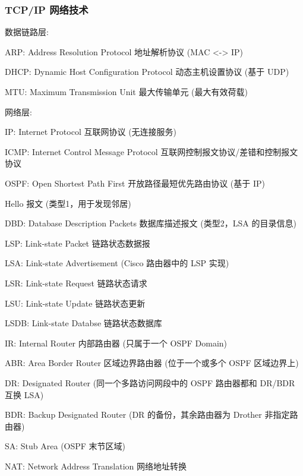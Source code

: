 \documentclass[UTF8,cs4size]{ctexart}
\begin{document}
\subsubsection{TCP/IP 网络技术}
数据链路层:
\begin{compactitem}
  \item ARP: Address Resolution Protocol 地址解析协议 (MAC <-> IP)
  \item DHCP: Dynamic Host Configuration Protocol 动态主机设置协议 (基于 UDP)
  \item MTU: Maximum Transmission Unit 最大传输单元 (最大有效荷载)
\end{compactitem}

网络层:
\begin{compactitem}
  \item IP: Internet Protocol 互联网协议 (无连接服务)
  \item ICMP: Internet Control Message Protocol 互联网控制报文协议/差错和控制报文协议
  \item OSPF: Open Shortest Path First 开放路径最短优先路由协议 (基于 IP)
  \item Hello 报文 (类型1，用于发现邻居)
  \item DBD: Database Description Packets 数据库描述报文 (类型2，LSA 的目录信息)
  \item LSP: Link-state Packet 链路状态数据报
  \item LSA: Link-state Advertisement (Cisco 路由器中的 LSP 实现)
  \item LSR: Link-state Request 链路状态请求
  \item LSU: Link-state Update 链路状态更新
  \item LSDB: Link-state Databse 链路状态数据库
  \item IR: Internal Router 内部路由器 (只属于一个 OSPF Domain)
  \item ABR: Area Border Router 区域边界路由器 (位于一个或多个 OSPF 区域边界上)
  \item DR: Designated Router (同一个多路访问网段中的 OSPF 路由器都和 DR/BDR 互换 LSA)
  \item BDR: Backup Designated Router (DR 的备份，其余路由器为 Drother 非指定路由器)
  \item SA: Stub Area (OSPF 末节区域)
  \item NAT: Network Address Translation 网络地址转换
\end{compactitem}
\end{document}
